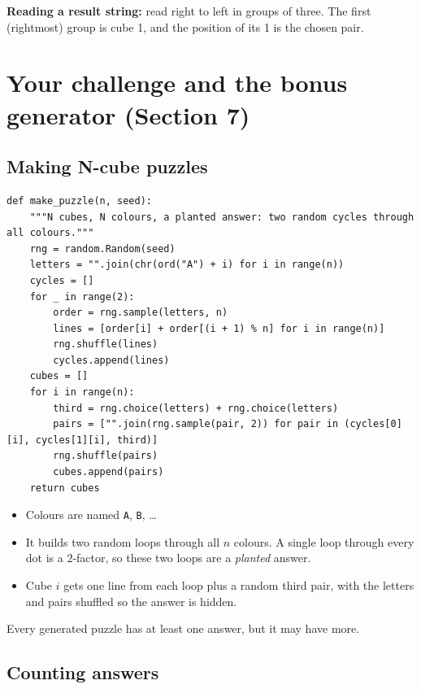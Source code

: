 \documentclass[11pt]{article}
\newcommand{\code}[1]{\texttt{#1}}
\begin{document}
\textbf{Reading a result string:} read right to left in groups of three. The
first (rightmost) group is cube 1, and the position of its 1 is the chosen pair.

\section{Your challenge and the bonus generator (Section 7)}

\subsection{Making N-cube puzzles}

\begin{lstlisting}
def make_puzzle(n, seed):
    """N cubes, N colours, a planted answer: two random cycles through all colours."""
    rng = random.Random(seed)
    letters = "".join(chr(ord("A") + i) for i in range(n))
    cycles = []
    for _ in range(2):
        order = rng.sample(letters, n)
        lines = [order[i] + order[(i + 1) % n] for i in range(n)]
        rng.shuffle(lines)
        cycles.append(lines)
    cubes = []
    for i in range(n):
        third = rng.choice(letters) + rng.choice(letters)
        pairs = ["".join(rng.sample(pair, 2)) for pair in (cycles[0][i], cycles[1][i], third)]
        rng.shuffle(pairs)
        cubes.append(pairs)
    return cubes
\end{lstlisting}

\begin{itemize}
  \item Colours are named \code{A}, \code{B}, \ldots
  \item It builds two random loops through all $n$ colours. A single loop
        through every dot is a 2-factor, so these two loops are a
        \emph{planted} answer.
  \item Cube $i$ gets one line from each loop plus a random third pair, with
        the letters and pairs shuffled so the answer is hidden.
\end{itemize}
Every generated puzzle has at least one answer, but it may have more.

\subsection{Counting answers}
\end{document}
